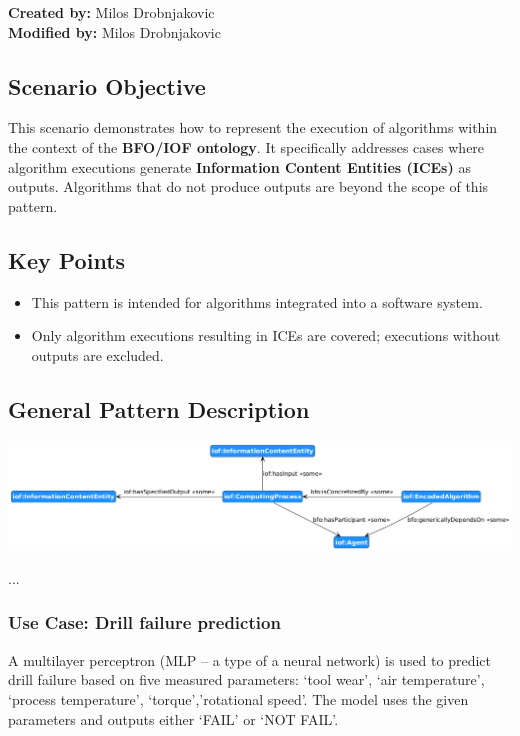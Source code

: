 \textbf{Created by:} Milos Drobnjakovic \\
\textbf{Modified by:} Milos Drobnjakovic \\

\subsection*{Scenario Objective}


This scenario demonstrates how to represent the execution of algorithms within the context of the \textbf{BFO/IOF ontology}. It specifically addresses cases where algorithm executions generate \textbf{Information Content Entities (ICEs)} as outputs. Algorithms that do not produce outputs are beyond the scope of this pattern.

\subsection*{Key Points}
\begin{itemize}
    \item This pattern is intended for algorithms integrated into a software system.
    \item Only algorithm executions resulting in ICEs are covered; executions without outputs are excluded.
\end{itemize}


\subsection*{General Pattern Description}
\includegraphics[scale=0.4]{scenarios/algorithm-execution/images/algorithm-execution-general.png}

...

\subsubsection*{Use Case: Drill failure prediction} 
A multilayer perceptron (MLP – a type of a neural network) is used to predict drill failure based on five measured parameters: ‘tool wear’, ‘air temperature’, ‘process temperature’, ‘torque’,’rotational speed’. The model uses the given parameters and outputs either ‘FAIL’ or ‘NOT FAIL’.

